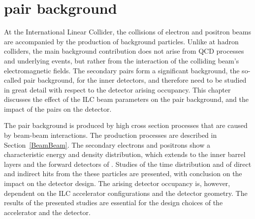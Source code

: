 \chapter{\positron\electron pair background}
\label{PairBkg}

\begin{chapterabstract}
 At the International Linear Collider, the collisions of electron and positron beams are accompanied by the production of background particles.
 Unlike at hadron colliders, the main background contribution does not arise from QCD processes and underlying events, but rather from the interaction of the colliding beam's electromagnetic fields.
 The secondary \positron\electron pairs form a significant background, the so-called pair background, for the inner detectors, and therefore need to be studied in great detail with respect to the detector arising occupancy.
 This chapter discusses the effect of the ILC beam parameters on the pair background, and the impact of the \positron\electron pairs on the \sid detector.
\end{chapterabstract}

The pair background is produced by high cross section processes that are caused by beam-beam interactions.
The production processes are described in Section~\ref{BeamBeam}.
The secondary electrons and positrons show a characteristic energy and density distribution, which extends to the inner barrel layers and the forward detectors of \sid.
Studies of the time distribution and of direct and indirect hits from the these particles are presented, with conclusion on the impact on the detector design.
The arising detector occupancy is, however, dependent on the ILC accelerator configurations and the detector geometry.
The results of the presented studies are essential for the design choices of the accelerator and the \sid detector.

